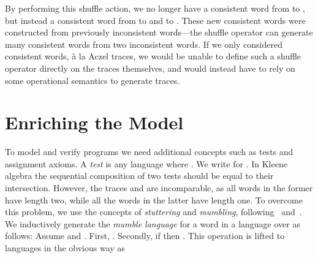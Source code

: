 \documentclass{llncs}
\begin{document}
\begin{center}
\end{center}

By performing this shuffle action, we no longer have a consistent word
from  to , but instead a consistent word from
 to  and  to . These new
consistent words were constructed from previously inconsistent
words---the shuffle operator can generate many consistent words from
two inconsistent words. If we only considered consistent words, \`a la
Aczel traces, we would be unable to define such a shuffle operator
directly on the traces themselves, and would instead have to rely on
some operational semantics to generate traces.

\section{Enriching the Model}

To model and verify programs we need additional concepts such as tests
and assignment axioms. A \emph{test} is any language  where . We write  for . In Kleene algebra the sequential composition of two
tests should be equal to their intersection. However, the traces
 and  are incomparable, as all
words in the former have length two, while all the words in the latter
have length one. To overcome this problem, we use the concepts of
\emph{stuttering} and \emph{mumbling},
following~\cite{brookes_full_1993}
and~\cite{dingel_refinement_2002}. We inductively generate the
\emph{mumble language}  for a word  in a language over
 as follows: Assume 
and . First, . Secondly,
if  then
. This operation is lifted to
languages in the obvious way as
\end{document}
